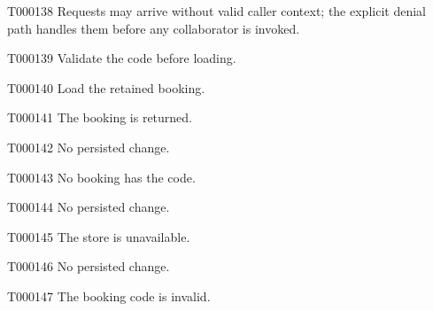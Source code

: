 \documentclass[11pt,a4paper]{article}
\begin{document}
\begin{atlasparagraph}{T000138}
Requests may arrive without valid caller context; the explicit denial path handles them before any collaborator is invoked.
\end{atlasparagraph}
\begin{atlasparagraph}{T000139}
Validate the code before loading.
\end{atlasparagraph}
\begin{atlasparagraph}{T000140}
Load the retained booking.
\end{atlasparagraph}
\begin{atlasparagraph}{T000141}
The booking is returned.
\end{atlasparagraph}
\begin{atlasparagraph}{T000142}
No persisted change.
\end{atlasparagraph}
\begin{atlasparagraph}{T000143}
No booking has the code.
\end{atlasparagraph}
\begin{atlasparagraph}{T000144}
No persisted change.
\end{atlasparagraph}
\begin{atlasparagraph}{T000145}
The store is unavailable.
\end{atlasparagraph}
\begin{atlasparagraph}{T000146}
No persisted change.
\end{atlasparagraph}
\begin{atlasparagraph}{T000147}
The booking code is invalid.
\end{atlasparagraph}
\end{document}
